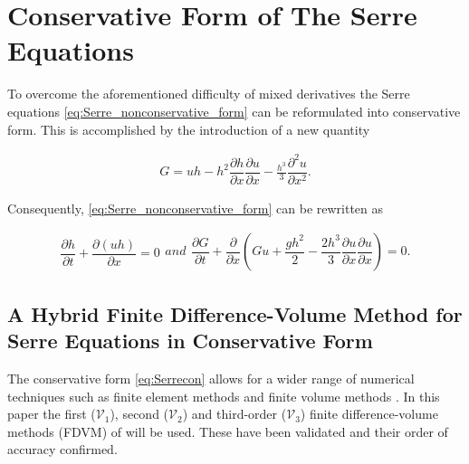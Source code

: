\documentclass[SingleSpace,12pt,Journal]{Serre_ASCE}
\begin{document}
\section{Conservative Form of The Serre Equations}
To overcome the aforementioned difficulty of mixed derivatives the Serre equations \eqref{eq:Serre_nonconservative_form} can be reformulated into conservative form. This is accomplished by the introduction of a new quantity \cite{Hank-etal-2010-2034,Zoppou-2014}
\begin{linenomath*}
\begin{gather}
\label{eq:Gdefinition}
G = uh - h^2 \dfrac{\partial h}{\partial x} \dfrac{\partial u}{\partial x} - \frac{h^3}{3} \dfrac{\partial^2 u}{\partial x^2}.
\end{gather}
\end{linenomath*}
Consequently, \eqref{eq:Serre_nonconservative_form} can be rewritten as
\begin{linenomath*}
\begin{subequations}
\begin{gather}
\dfrac{\partial h}{\partial t} + \dfrac{\partial (uh)}{\partial x} = 0
\label{eq:Serrecon_continuity}
\end{gather}
and
\begin{gather}
\dfrac{\partial G}{\partial t} + \dfrac{\partial}{\partial x}\left(Gu + \dfrac{gh^2}{2} - \dfrac{2h^3}{3}\dfrac{\partial u}{\partial x}\dfrac{\partial u}{\partial x}\right) = 0.
\label{eq:Serrecon_momentum}
\end{gather}
\label{eq:Serrecon}
\end{subequations}
\end{linenomath*}

\subsection{A Hybrid Finite Difference-Volume Method for Serre Equations in Conservative Form}
\label{section:hybridmethod}
The conservative form \eqref{eq:Serrecon} allows for a wider range of numerical techniques such as finite element methods \cite{Guyenne-etal-2014-169} and finite volume methods \cite{Hank-etal-2010-2034,Zoppou-2014}. In this paper the first ($\mathcal{V}_1$), second ($\mathcal{V}_2$) and third-order ($\mathcal{V}_3$) finite difference-volume methods (FDVM) of  will be used. These have been validated and their order of accuracy confirmed.
\end{document}
